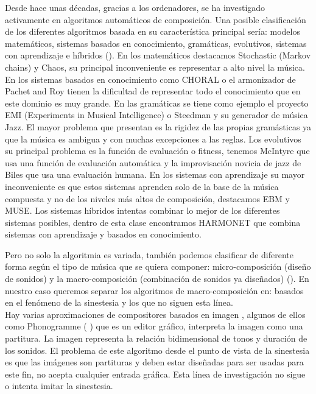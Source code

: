 Desde hace unas décadas, gracias a los ordenadores, se ha investigado activamente en algoritmos automáticos de composición. Una posible clasificación de los diferentes algoritmos basada en su característica principal sería: modelos matemáticos, sistemas basados en conocimiento, gramáticas, evolutivos, sistemas con aprendizaje e híbridos (\cite{AIMethodsForComposition}). 
En los matemáticos destacamos Stochastic (Markov chains) y Chaos, su principal inconveniente es representar a alto nivel la música. En los sistemas basados en conocimiento como CHORAL o el armonizador de Pachet and Roy tienen la dificultad de representar todo el conocimiento que en este dominio es muy grande. En las gramáticas se tiene como ejemplo el proyecto EMI (Experiments in Musical Intelligence) o Steedman y su generador de música Jazz. El mayor problema que presentan es la rigidez de las propias gramásticas ya que la música es ambigua y con muchas excepciones a las reglas. Los evolutivos su principal problema es la función de evaluación o fitness, tenemos McIntyre que usa una función de evaluación automática y la improvisación novicia de jazz de Biles que usa una evaluación humana. En los sistemas con aprendizaje su mayor inconveniente es que estos sistemas aprenden solo de la base de la música compuesta y no de los niveles más altos de composición, destacamos EBM y MUSE. Los sistemas híbridos intentas combinar lo mejor de los diferentes sistemas posibles, dentro de esta clase encontramos HARMONET que combina sistemas con aprendizaje y basados en conocimiento.

Pero no solo la algoritmia es variada, también podemos clasificar de diferente forma según el tipo de música que se quiera componer: micro-composición (diseño de sonidos) y la macro-composición (combinación de sonidos ya diseñados) (\cite{AudioVisualSurvey}). En nuestro caso queremos separar los algoritmos de macro-composición en: basados en el fenómeno de la sinestesia y los que no siguen esta línea.\\

Hay varias aproximaciones de compositores basados en imagen , algunos de ellos como Phonogramme (\cite{ImageBaseComposition} \cite{Phonogramme}) que es un editor gráfico, interpreta la imagen como una partitura. La imagen representa la relación bidimensional de tonos y duración de los sonidos. El problema de este algoritmo desde el punto de vista de la sinestesia es que las imágenes son partituras y deben estar diseñadas para ser usadas para este fin, no acepta cualquier entrada gráfica. Esta línea de investigación no sigue o intenta imitar la sinestesia.\\

